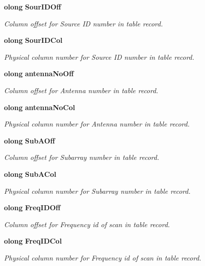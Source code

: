 \begin{CompactItemize}
{\bf olong} {\bf Sour\-IDOff}
\begin{CompactList}\small\item\em Column offset for Source ID number in table record. \item\end{CompactList}\item 
{\bf olong} {\bf Sour\-IDCol}
\begin{CompactList}\small\item\em Physical column number for Source ID number in table record. \item\end{CompactList}\item 
{\bf olong} {\bf antenna\-No\-Off}
\begin{CompactList}\small\item\em Column offset for Antenna number in table record. \item\end{CompactList}\item 
{\bf olong} {\bf antenna\-No\-Col}
\begin{CompactList}\small\item\em Physical column number for Antenna number in table record. \item\end{CompactList}\item 
{\bf olong} {\bf Sub\-AOff}
\begin{CompactList}\small\item\em Column offset for Subarray number in table record. \item\end{CompactList}\item 
{\bf olong} {\bf Sub\-ACol}
\begin{CompactList}\small\item\em Physical column number for Subarray number in table record. \item\end{CompactList}\item 
{\bf olong} {\bf Freq\-IDOff}
\begin{CompactList}\small\item\em Column offset for Frequency id of scan in table record. \item\end{CompactList}\item 
{\bf olong} {\bf Freq\-IDCol}
\begin{CompactList}\small\item\em Physical column number for Frequency id of scan in table record. \item\end{CompactList}\item 

\end{CompactItemize}
